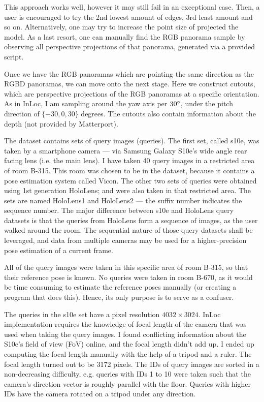 \documentclass[twoside]{ctuthesis}
\theoremstyle{plain}
\theoremstyle{definition}
\theoremstyle{note}
\begin{document}
This approach works well, however it may still fail in an exceptional case. Then, a user is encouraged to try the 2nd lowest amount of edges, 3rd least amount and so on. Alternatively, one may try to increase the point size of projected the model. As a last resort, one can manually find the RGB panorama sample by observing all perspective projections of that panorama, generated via a provided script.

Once we have the RGB panoramas which are pointing the same direction as the RGBD panoramas, we can move onto the next stage. Here we construct cutouts, which are perspective projections of the RGB panoramas at a specific orientation. As in InLoc, I am sampling around the yaw axis per $30\degree$, under the pitch direction of $\{-30, 0, 30\}$ degrees. The cutouts also contain information about the depth (not provided by Matterport).

The dataset contains sets of query images (queries). The first set, called s10e, was taken by a smartphone camera --- via Samsung Galaxy S10e's wide angle rear facing lens (i.e. the main lens). I have taken 40 query images in a restricted area of room B-315. This room was chosen to be in the dataset, because it contains a pose estimation system called Vicon. The other two sets of queries were obtained using 1st generation HoloLens; and were also taken in that restricted area. The sets are named HoloLens1 and HoloLens2 --- the suffix number indicates the sequence number. The major difference between s10e and HoloLens query datasets is that the queries from HoloLens form a sequence of images, as the user walked around the room. The sequential nature of those query datasets shall be leveraged, and data from multiple cameras may be used for a higher-precision pose estimation of a current frame.

All of the query images were taken in this specific area of room B-315, so that their reference pose is known. No queries were taken in room B-670, as it would be time consuming to estimate the reference poses manually (or creating a program that does this). Hence, its only purpose is to serve as a confuser.

The queries in the s10e set have a pixel resolution $4032 \times 3024$. InLoc implementation requires the knowledge of focal length of the camera that was used when taking the query images. I found conflicting information about the S10e's field of view (FoV) online, and the focal length didn't add up. I ended up computing the focal length manually with the help of a tripod and a ruler. The focal length turned out to be 3172 pixels. The IDs of query images are sorted in a non-decreasing difficulty, e.g. queries with IDs 1 to 10 were taken such that the camera's direction vector is roughly parallel with the floor. Queries with higher IDs have the camera rotated on a tripod under any direction.
\end{document}
